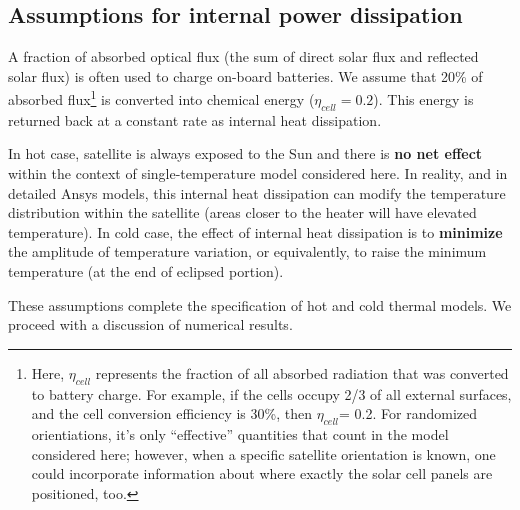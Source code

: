 \documentclass[]{aastex62}
\begin{document}
\newpage
\subsection{Assumptions for internal power dissipation}


A fraction of absorbed optical flux (the sum of direct solar flux and reflected solar flux) is often 
used to charge on-board batteries. We assume that 20\% of absorbed flux\footnote{Here, $\eta_{cell}$ 
represents the fraction of all absorbed radiation that was converted to battery charge. For example, if 
the cells occupy 2/3 of all external surfaces, and the cell conversion efficiency is 30\%, then $\eta_{cell}$= 0.2. 
For randomized orientiations, it's only ``effective'' quantities that count in the model considered here; 
however, when a specific satellite orientation is known, one could incorporate information about where 
exactly the solar cell panels are positioned, too.} is converted into chemical
energy ($\eta_{cell}=0.2$). This energy is returned back at a constant rate as internal heat dissipation. 

In hot case, satellite is always exposed to the Sun and there is {\bf no net effect} within the context
of single-temperature model considered here. In reality, and in detailed Ansys models, this
internal heat dissipation can modify the temperature distribution within the satellite (areas closer
to the heater will have elevated temperature). In cold case, the effect of internal heat dissipation
is to {\bf minimize} the amplitude of temperature variation, or equivalently, to raise the minimum
temperature (at the end of eclipsed portion). 
 
These assumptions complete the specification of hot and cold thermal models. We proceed
with a discussion of numerical results. 
\end{document}
